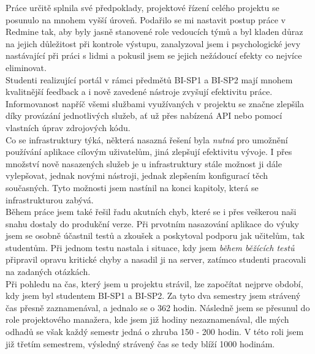 Práce určitě splnila své předpoklady, projektové řízení celého projektu se posunulo na mnohem vyšší úroveň. Podařilo se mi nastavit postup práce v Redmine tak, aby byly jasně stanovené role vedoucích týmů a byl kladen důraz na jejich důležitost při kontrole výstupu, zanalyzoval jsem i psychologické jevy nastávající při práci s lidmi a pokusil jsem se jejich nežádoucí efekty co nejvíce eliminovat.\\
Studenti realizující portál v rámci předmětů BI-SP1 a BI-SP2 mají mnohem kvalitnější feedback a i nově zavedené nástroje zvyšují efektivitu práce. Informovanost napříč všemi službami využívaných v projektu se značne zlepšila díky provázání jednotlivých služeb, ať už přes nabízená API nebo pomocí vlastních úprav zdrojových kódu.\\
Co se infrastruktury týká, některá nasazná řešení byla \emph{nutná} pro umožnění používání aplikace cílovým uživatelům, jiná zlepšují efektivitu vývoje. I přes množství nově nasazených služeb je u infrastruktury stále možnost ji dále vylepšovat, jednak novými nástroji, jednak zlepšením konfigurací těch současných. Tyto možnosti jsem nastínil na konci kapitoly, která se infrastrukturou zabývá.\\
Během práce jsem také řešil řadu akutních chyb, které se i přes veškerou naši snahu dostaly do produkční verze. Při prvotním nasazování aplikace do výuky jsem se osobně účastnil testů a zkoušek a poskytoval podporu jak učitelům, tak studentům. Při jednom testu nastala i situace, kdy jsem \emph{během běžících testů} připravil opravu kritické chyby a nasadil ji na server, zatímco studenti pracovali na zadaných otázkách.\\
Při pohledu na čas, který jsem u projektu strávil, lze započítat nejprve období, kdy jsem byl studentem BI-SP1 a BI-SP2. Za tyto dva semestry jsem strávený čas přesně zaznamenával, a jednalo se o 362 hodin. Následně jsem se přesunul do role projektového manažera, kde jsem již hodiny nezaznamenával, dle mých odhadů se však každý semestr jedná o zhruba 150 - 200 hodin. V této roli jsem již třetím semestrem, výsledný strávený čas se tedy blíží 1000 hodinám.

